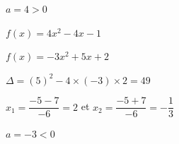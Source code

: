\documentclass[11pt,a4paper]{article}  %
\begin{document}
\begin{enumMet}
\begin{corrBox}
		$a=4>0$
		
	\end{corrBox}
	\item $f(x)=4 x^2-4 x-1$
	\item $f(x)=-3 x^2+5 x+2$
	\begin{corrBox}
		$\Delta=(5)^2-4\times (-3)\times 2=49$
		
		$x_1=\dfrac{-5-7}{-6}=2$ et $x_2=\dfrac{-5+7}{-6}=-\dfrac{1}{3}$
		
		$a=-3<0$
		
	\end{corrBox}
\end{enumMet}


\exercice{}
\end{document}

